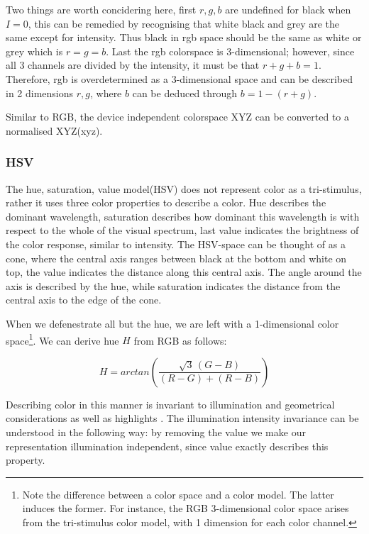 \documentclass[a4paper,11pt]{article}
\begin{document}
Two things are worth concidering here, first $r,g,b$ are undefined for black when $I=0$, this can be remedied by recognising that white black and grey are the same except for intensity. Thus black in rgb space should be the same as white or grey which is $r=g=b$. Last the rgb colorspace is 3-dimensional; however, since all 3 channels are divided by the intensity, it must be that $r+g+b=1$. Therefore, rgb is overdetermined as a 3-dimensional space and can be described in 2 dimensions $r,g$, where $b$ can be deduced through $b=1-(r+g)$.



Similar to RGB, the device independent colorspace XYZ can be converted to a normalised XYZ(xyz).		

		

\subsubsection{HSV}

The hue, saturation, value model(HSV) does not represent color as a tri-stimulus, rather it uses three color properties to describe a color. Hue describes the dominant wavelength, saturation describes how dominant this wavelength is with respect to the whole of the visual spectrum, last value indicates the brightness of the color response, similar to intensity. The HSV-space can be thought of as a cone, where the central axis ranges between black at the bottom and white on top, the value indicates the distance along this central axis. The angle around the axis is described by the hue, while saturation indicates the distance from the central axis to the edge of the cone. 



When we defenestrate all but the hue, we are left with a 1-dimensional color space\footnote{Note the difference between a color space and a color model. The latter induces the former. For instance, the RGB 3-dimensional color space arises from the tri-stimulus color model, with 1 dimension for each color channel.}.  We can derive hue $H$ from RGB as follows:



\begin{equation}
\label{eq:hue}
H = arctan\left(\frac{\sqrt{3}\,(G-B)}{(R-G)+(R-B)}\right)
\end{equation} 



Describing color in this manner is invariant to illumination and geometrical considerations as well as highlights \cite{gevers_invariant}. The illumination intensity invariance can be understood in the following way: by removing the value we make our representation illumination independent, since value exactly describes this property.
\end{document}
